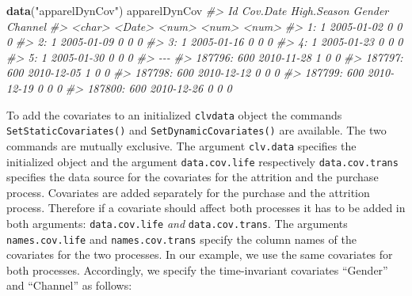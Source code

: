 \documentclass[
]{article}
\newenvironment{Shaded}{\begin{snugshade}}{\end{snugshade}}
\newcommand{\CommentTok}[1]{\textcolor[rgb]{0.56,0.35,0.01}{\textit{#1}}}
\newcommand{\FunctionTok}[1]{\textcolor[rgb]{0.13,0.29,0.53}{\textbf{#1}}}
\newcommand{\NormalTok}[1]{#1}
\newcommand{\StringTok}[1]{\textcolor[rgb]{0.31,0.60,0.02}{#1}}
\begin{document}
\begin{Shaded}
\begin{Highlighting}[]
\FunctionTok{data}\NormalTok{(}\StringTok{"apparelDynCov"}\NormalTok{)}
\NormalTok{apparelDynCov}
\CommentTok{\#\textgreater{}             Id   Cov.Date High.Season Gender Channel}
\CommentTok{\#\textgreater{}         \textless{}char\textgreater{}     \textless{}Date\textgreater{}       \textless{}num\textgreater{}  \textless{}num\textgreater{}   \textless{}num\textgreater{}}
\CommentTok{\#\textgreater{}      1:      1 2005{-}01{-}02           0      0       0}
\CommentTok{\#\textgreater{}      2:      1 2005{-}01{-}09           0      0       0}
\CommentTok{\#\textgreater{}      3:      1 2005{-}01{-}16           0      0       0}
\CommentTok{\#\textgreater{}      4:      1 2005{-}01{-}23           0      0       0}
\CommentTok{\#\textgreater{}      5:      1 2005{-}01{-}30           0      0       0}
\CommentTok{\#\textgreater{}     {-}{-}{-}                                             }
\CommentTok{\#\textgreater{} 187796:    600 2010{-}11{-}28           1      0       0}
\CommentTok{\#\textgreater{} 187797:    600 2010{-}12{-}05           1      0       0}
\CommentTok{\#\textgreater{} 187798:    600 2010{-}12{-}12           0      0       0}
\CommentTok{\#\textgreater{} 187799:    600 2010{-}12{-}19           0      0       0}
\CommentTok{\#\textgreater{} 187800:    600 2010{-}12{-}26           0      0       0}
\end{Highlighting}
\end{Shaded}

To add the covariates to an initialized \texttt{clvdata} object the
commands \texttt{SetStaticCovariates()} and
\texttt{SetDynamicCovariates()} are available. The two commands are
mutually exclusive. The argument \texttt{clv.data} specifies the
initialized object and the argument \texttt{data.cov.life} respectively
\texttt{data.cov.trans} specifies the data source for the covariates for
the attrition and the purchase process. Covariates are added separately
for the purchase and the attrition process. Therefore if a covariate
should affect both processes it has to be added in both arguments:
\texttt{data.cov.life} \emph{and} \texttt{data.cov.trans}. The arguments
\texttt{names.cov.life} and \texttt{names.cov.trans} specify the column
names of the covariates for the two processes. In our example, we use
the same covariates for both processes. Accordingly, we specify the
time-invariant covariates ``Gender'' and ``Channel'' as follows:
\end{document}
